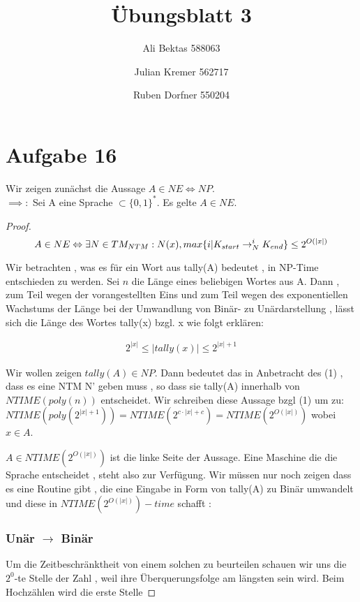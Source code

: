 \documentclass{article}
\title{Übungsblatt 3}
\author{Ali Bektas 588063 \and Julian Kremer 562717 \and Ruben Dorfner 550204}
\begin{document}
\maketitle

\section*{Aufgabe 16}
\vspace{10px}

Wir zeigen zunächst die Aussage $A \in NE \Leftrightarrow NP$.\\
$\implies :$
Sei A eine Sprache  $ \subset \{0,1\}^*$. Es gelte $A \in NE$.

\begin{proof}

\[ A \in NE  \Leftrightarrow \exists N \in TM_{NTM} : N(x) , max\{ i | K_{start} \rightarrow^i_N K_{end}\}  \leq 2^{O(|x|)} \\
\]

Wir betrachten , 
was es für ein Wort aus tally(A) bedeutet , in NP-Time entschieden zu werden. 
Sei $n$ die Länge eines beliebigen Wortes aus  A. Dann  , zum Teil wegen der vorangestellten Eins und zum Teil wegen des exponentiellen Wachstums der Länge bei der Umwandlung von Binär- zu Unärdarstellung , lässt sich die Länge des Wortes tally(x) bzgl. x wie folgt erklären:

\begin{align}
2^{|x|} \leq |tally(x)| \leq 2^{|x|+1}
\end{align}


Wir wollen zeigen $ tally(A) \in NP $.  Dann bedeutet das in Anbetracht des (1) , dass es eine NTM N' geben muss , so dass sie tally(A) innerhalb von $NTIME(poly(n))$ entscheidet. Wir schreiben diese Aussage bzgl (1) um zu: $NTIME(poly(2^{|x| +1})) = NTIME(2^{c\cdot|x|+c}) = NTIME(2^{O(|x|)})$ wobei $x \in A$.

$A \in NTIME(2^{O(|x|)})$ ist die linke Seite der Aussage. Eine Maschine die die Sprache entscheidet , steht also zur Verfügung. Wir müssen nur noch zeigen dass es eine Routine gibt , die eine Eingabe in Form von tally(A) zu Binär umwandelt und diese in  $NTIME(2^{O(|x|)})-time$ schafft : 


\subsubsection*{Unär $\rightarrow$ Binär}

Um die Zeitbeschränktheit von einem solchen zu beurteilen schauen wir uns die $2^0$-te Stelle der Zahl , weil ihre Überquerungsfolge am längsten sein wird. Beim Hochzählen wird die erste Stelle 


\end{proof}
\end{document}
